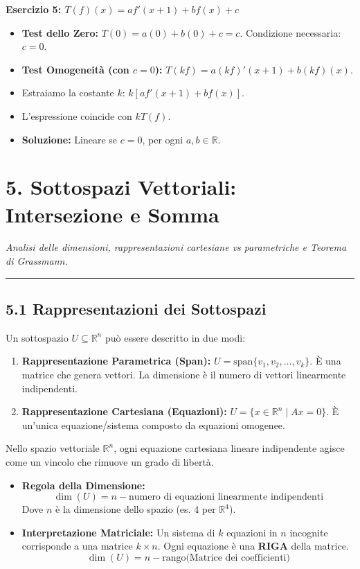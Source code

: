 \documentclass[10pt,a4paper]{article}
\begin{document}
\textbf{Esercizio 5: $T(f)(x) = a f'(x+1) + b f(x) + c$}
\begin{itemize}
    \item \textbf{Test dello Zero:} $T(0) = a(0) + b(0) + c = c$. Condizione necessaria: $c=0$.
    \item \textbf{Test Omogeneità (con $c=0$):} $T(kf) = a(kf)'(x+1) + b(kf)(x)$.
    \item Estraiamo la costante $k$: $k [ a f'(x+1) + b f(x) ]$.
    \item L'espressione coincide con $k T(f)$.
    \item \textbf{Soluzione:} Lineare se $c=0$, per ogni $a, b \in \mathbb{R}$.
\end{itemize}
\section*{5. Sottospazi Vettoriali: Intersezione e Somma}
\textit{Analisi delle dimensioni, rappresentazioni cartesiane vs parametriche e Teorema di Grassmann.}

\hrule
\vspace{0.4cm}

\subsection*{5.1 Rappresentazioni dei Sottospazi}
Un sottospazio $U \subseteq \mathbb{R}^n$ può essere descritto in due modi:
\begin{enumerate}
    \item \textbf{Rappresentazione Parametrica (Span):}
    $U = \text{span}\{v_1, v_2, \dots, v_k\}$.
    È una matrice che genera vettori. La dimensione è il numero di vettori linearmente indipendenti.
    
    \item \textbf{Rappresentazione Cartesiana (Equazioni):}
    $U = \{ x \in \mathbb{R}^n \mid Ax = 0 \}$.
    È un'unica equazione/sistema composto da equazioni omogenee.
\end{enumerate}

\vspace{0.3cm}

\begin{tcolorbox}[colback=blue!5!white, colframe=blue!75!black, title=\textbf{Rettifica}]
Nello spazio vettoriale $\mathbb{R}^n$, ogni equazione cartesiana lineare indipendente agisce come un vincolo che rimuove un grado di libertà.

\begin{itemize}
    \item \textbf{Regola della Dimensione:}
    \[ \dim(U) = n - \text{numero di equazioni linearmente indipendenti} \]
    Dove $n$ è la dimensione dello spazio (es. 4 per $\mathbb{R}^4$).
    
    \item \textbf{Interpretazione Matriciale:}
    Un sistema di $k$ equazioni in $n$ incognite corrisponde a una matrice $k \times n$. Ogni equazione è una \textbf{RIGA} della matrice.
    \[ \dim(U) = n - \text{rango(Matrice dei coefficienti)} \]
\end{itemize}
\end{tcolorbox}
\end{document}
